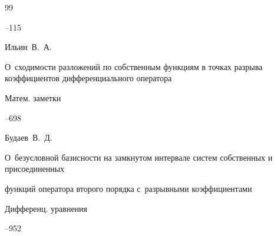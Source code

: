\begin{thebibliography}{99}


--115






\by Ильин~В.~А.

\paper О~сходимости разложений по собственным функциям в точках разрыва коэффициентов дифференциального оператора

\jour Матем. заметки




--698














\by Будаев~В.~Д. 

\paper О~безусловной базисности на замкнутом интервале систем собственных и присоединенных 

функций оператора второго порядка с~разрывными коэффициентами

\jour Дифференц. уравнения




--952








\end{thebibliography}
